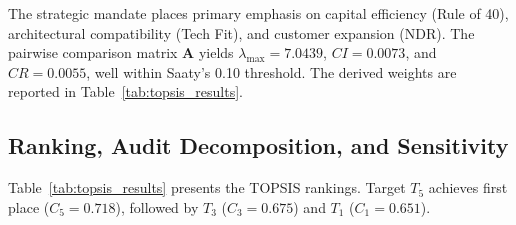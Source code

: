 \documentclass[conference]{IEEEtran}
\begin{document}
\begin{table}[b]
\centering
\caption{Demonstration Enterprise SaaS Target Data}
\label{tab:target_data}
\end{table}

The strategic mandate places primary emphasis on capital efficiency (Rule of 40), architectural compatibility (Tech Fit), and customer expansion (NDR). The pairwise comparison matrix $\mathbf{A}$ yields $\lambda_{\max} = 7.0439$, $CI = 0.0073$, and $CR = 0.0055$, well within Saaty's 0.10 threshold. The derived weights are reported in Table~\ref{tab:topsis_results}.

\subsection{Ranking, Audit Decomposition, and Sensitivity}
Table~\ref{tab:topsis_results} presents the TOPSIS rankings. Target $T_5$ achieves first place ($C_5 = 0.718$), followed by $T_3$ ($C_3 = 0.675$) and $T_1$ ($C_1 = 0.651$). 
\end{document}
